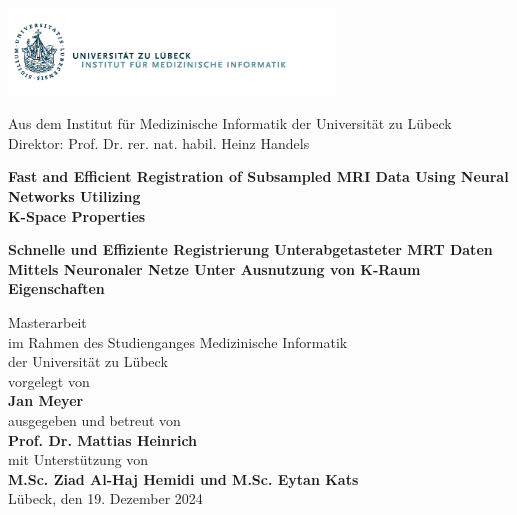 
\addtolength{\topmargin}{-1.2cm} 
\addtolength{\textwidth}{2.35cm} 

\vspace*{-2.7cm}
\hspace*{-2cm}
\includegraphics[width=0.65\textwidth]{./images/Logo_IMI}
\vspace*{0.4cm}
\begin{center}


\enlargethispage{5cm}
Aus dem Institut für Medizinische Informatik 
der Universität zu Lübeck\\
Direktor: Prof. Dr. rer. nat. habil. Heinz Handels\\[1.8cm]

\begin{Large}
\textcolor{Ocean}{{\textbf{Fast and Efficient Registration of Subsampled MRI Data Using Neural Networks Utilizing\\K-Space Properties} }}\\ 
\end{Large}
\vspace*{1.5cm}
\begin{large}
{{\textbf{Schnelle und Effiziente Registrierung Unterabgetasteter MRT Daten Mittels Neuronaler Netze Unter Ausnutzung von K-Raum Eigenschaften} }}\\ 
\end{large}
\vspace*{2.5cm}
%
Masterarbeit\\ 
im Rahmen des Studienganges Medizinische Informatik\\
der Universität zu Lübeck\\[1.0cm]
%
vorgelegt von\\[0.1cm]
\textbf{Jan Meyer}\\[1.0cm]
%
ausgegeben und betreut von\\[0.1cm]
\textbf{Prof. Dr. Mattias Heinrich}\\[0.3cm]
mit Unterstützung von\\[0.1cm]
\textbf{M.Sc. Ziad Al-Haj Hemidi und M.Sc. Eytan Kats}\\[2.8cm]
%
Lübeck, den 19. Dezember 2024
\end{center}
  
